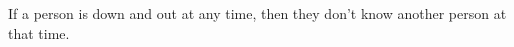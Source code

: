 \item {If a person is down and out at any time, then they don't know another person at that time.}

